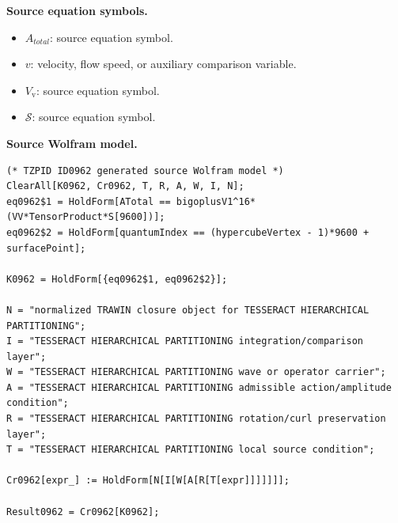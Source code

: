 \begin{minipage}[t]{0.49\linewidth}
\begingroup
\small
\raggedright
\textbf{Source equation symbols.}\par
\begin{itemize}[leftmargin=1.35em,itemsep=1pt,topsep=1pt,parsep=0pt]
    \item $A_{total}$: source equation symbol.
    \item $v$: velocity, flow speed, or auxiliary comparison variable.
    \item $V_{\mathrm{v}}$: source equation symbol.
    \item $\mathcal{S}$: source equation symbol.
\end{itemize}
\endgroup
\end{minipage}\hfill
\begin{minipage}[t]{0.47\linewidth}
\begingroup
\scriptsize
\raggedright
\textbf{Source Wolfram model.}\par
\begin{Verbatim}[fontsize=\tiny,breaklines=true,breakanywhere=true]
(* TZPID ID0962 generated source Wolfram model *)
ClearAll[K0962, Cr0962, T, R, A, W, I, N];
eq0962$1 = HoldForm[ATotal == bigoplusV1^16*(VV*TensorProduct*S[9600])];
eq0962$2 = HoldForm[quantumIndex == (hypercubeVertex - 1)*9600 + surfacePoint];

K0962 = HoldForm[{eq0962$1, eq0962$2}];

N = "normalized TRAWIN closure object for TESSERACT HIERARCHICAL PARTITIONING";
I = "TESSERACT HIERARCHICAL PARTITIONING integration/comparison layer";
W = "TESSERACT HIERARCHICAL PARTITIONING wave or operator carrier";
A = "TESSERACT HIERARCHICAL PARTITIONING admissible action/amplitude condition";
R = "TESSERACT HIERARCHICAL PARTITIONING rotation/curl preservation layer";
T = "TESSERACT HIERARCHICAL PARTITIONING local source condition";

Cr0962[expr_] := HoldForm[N[I[W[A[R[T[expr]]]]]]];

Result0962 = Cr0962[K0962];
\end{Verbatim}
\endgroup
\end{minipage}

